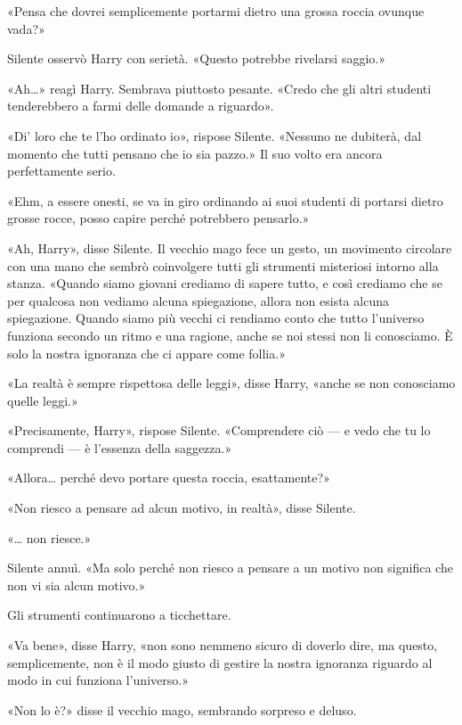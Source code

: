 «Pensa che dovrei semplicemente portarmi dietro una grossa roccia ovunque vada?»

Silente osservò Harry con serietà. «Questo potrebbe rivelarsi saggio.»

«Ah…» reagì Harry. Sembrava piuttosto pesante. «Credo che gli altri studenti tenderebbero a farmi delle domande a riguardo».

«Di’ loro che te l’ho ordinato io», rispose Silente. «Nessuno ne dubiterà, dal momento che tutti pensano che io sia pazzo.» Il suo volto era ancora perfettamente serio.

«Ehm, a essere onesti, se va in giro ordinando ai suoi studenti di portarsi dietro grosse rocce, posso capire perché potrebbero pensarlo.»

«Ah, Harry», disse Silente. Il vecchio mago fece un gesto, un movimento circolare con una mano che sembrò coinvolgere tutti gli strumenti misteriosi intorno alla stanza. «Quando siamo giovani crediamo di sapere tutto, e così crediamo che se per qualcosa non vediamo alcuna spiegazione, allora non esista alcuna spiegazione. Quando siamo più vecchi ci rendiamo conto che tutto l’universo funziona secondo un ritmo e una ragione, anche se noi stessi non li conosciamo. È solo la nostra ignoranza che ci appare come follia.»

«La realtà è sempre rispettosa delle leggi», disse Harry, «anche se non conosciamo quelle leggi.»

«Precisamente, Harry», rispose Silente. «Comprendere ciò — e vedo che tu lo comprendi — è l’essenza della saggezza.»

«Allora… perché devo portare questa roccia, esattamente?»

«Non riesco a pensare ad alcun motivo, in realtà», disse Silente.

«… non riesce.»

Silente annuì. «Ma solo perché non riesco a pensare a un motivo non significa che non vi sia alcun motivo.»

Gli strumenti continuarono a ticchettare.

«Va bene», disse Harry, «non sono nemmeno sicuro di doverlo dire, ma questo, semplicemente, non è il modo giusto di gestire la nostra ignoranza riguardo al modo in cui funziona l’universo.»

«Non lo è?» disse il vecchio mago, sembrando sorpreso e deluso.

